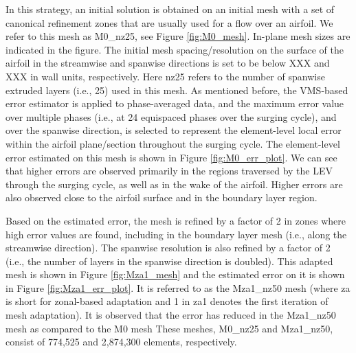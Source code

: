 In this strategy, an initial solution is obtained on an initial mesh with a set of canonical refinement zones that are usually used for a flow over an airfoil. We refer to this mesh as M0\_nz25, see Figure \ref{fig:M0_mesh}. In-plane mesh sizes are indicated in the figure. The initial mesh spacing/resolution on the surface of the airfoil in the streamwise and spanwise directions is set to be below XXX and XXX in wall units, respectively.
Here nz25 refers to the number of spanwise extruded layers (i.e., 25) used in this mesh. 
As mentioned before, the VMS-based error estimator is applied to phase-averaged data, and the maximum error value over multiple phases (i.e., at 24 equispaced phases over the surging cycle), and over the spanwise direction, is selected to represent the element-level local error within the airfoil plane/section throughout the surging cycle. 
The element-level error estimated on this mesh is shown in Figure \ref{fig:M0_err_plot}. 
We can see that higher errors are observed primarily in the regions traversed by the LEV through the surging cycle, as well as in the wake of the airfoil. 
Higher errors are also observed close to the airfoil surface and in the boundary layer region.

Based on the estimated error, the mesh is refined by a factor of 2 in zones where high error values are found, including in the boundary layer mesh (i.e., along the streamwise direction). 
The spanwise resolution is also refined by a factor of 2 (i.e., the number of layers in the spanwise direction is doubled). 
This adapted mesh is shown in Figure \ref{fig:Mza1_mesh} and the estimated error on it is shown in Figure \ref{fig:Mza1_err_plot}. It is referred to as the Mza1\_nz50 mesh (where za is short for zonal-based adaptation and 1 in za1 denotes the first iteration of mesh adaptation).
It is observed that the error has reduced in the Mza1\_nz50 mesh as compared to the M0 mesh
These meshes, M0\_nz25 and Mza1\_nz50, consist of 774,525 and 2,874,300 elements, respectively.


